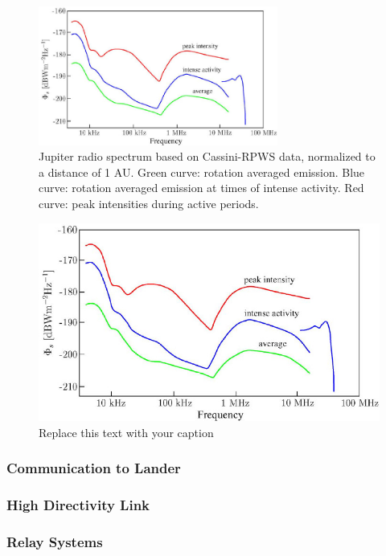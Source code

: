 \documentclass{book}
\begin{document}
\begin{figure}[ht]
\centering
\label{J_spec}
\includegraphics[width=0.7\textwidth]{figures/below100.jpg}
\caption{Jupiter radio spectrum based on Cassini-RPWS data,
normalized to a distance of 1 AU. Green curve: rotation averaged
emission. Blue curve: rotation averaged emission at times of intense
activity. Red curve: peak intensities during active periods. \cite{Grie_meier_2005}}
\end{figure}


\begin{figure}[ht]
\begin{center}
\includegraphics[width=0.7\columnwidth]{figures/below100}
\caption{Replace this text with your caption%
}
\end{center}
\end{figure}

\subsubsection{Communication to Lander}


\subsubsection{High Directivity Link}

\subsubsection{Relay Systems}
\end{document}
